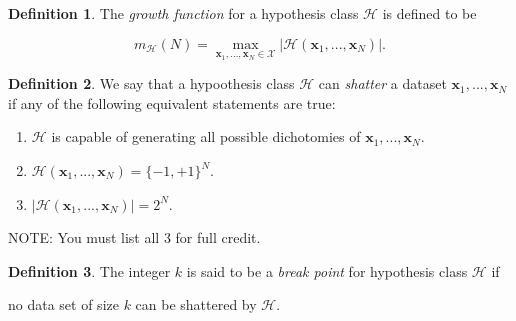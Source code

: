 \documentclass[10pt]{exam}
\theoremstyle{definition}
\newtheorem{defn}{Definition}
\newcommand{\x}{\mathbf x}
\begin{document}
\begin{defn}
    The \emph{growth function} for a hypothesis class $\mathcal H$ is defined to be
    \begin{solutionorbox}
    \begin{equation*}
        m_{\mathcal H}(N) = \max_{\x_1,...,\x_N\in\mathcal X} \big| \mathcal H(\x_1, ..., \x_N) \big|.
    \end{equation*}
    \end{solutionorbox}
\end{defn}

\begin{defn}
    We say that a hypoothesis class $\mathcal H$ can \emph{shatter} a dataset $\x_1, ..., \x_N$ if any of the following equivalent statements are true:
    \begin{solutionorbox}
    \begin{enumerate}
        \item $\mathcal H$ is capable of generating all possible dichotomies of $\x_1, ..., \x_N$.
        \item $\mathcal H(\x_1, ..., \x_N) = \{-1, +1\}^N$.
        \item $\left|\mathcal H(\x_1, ..., \x_N)\right| = 2^N$.
    \end{enumerate}

        NOTE: You must list all 3 for full credit.
    \end{solutionorbox}
\end{defn}
\begin{defn}
The integer $k$ is said to be a \emph{break point} for hypothesis class $\mathcal H$ if
    \begin{solutionorbox}
    no data set of size $k$ can be shattered by $\mathcal H$.
    \end{solutionorbox}
\end{defn}
\end{document}
